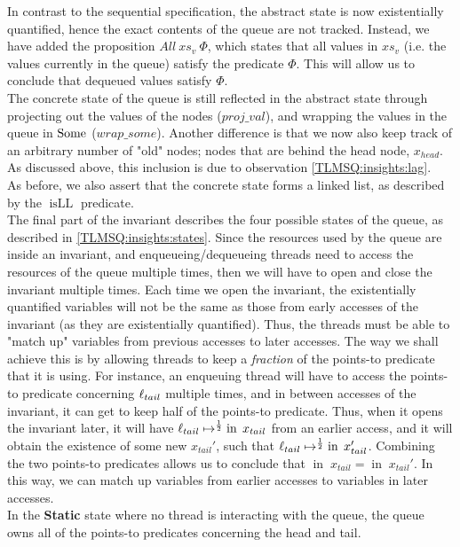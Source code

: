 \documentclass[a4paper, 11pt]{report}
\newcommand{\isLL}{\operatorname{isLL}}
\newcommand{\nIn}[1]{\operatorname{in} \; #1}
\newcommand{\StaticState}{\textbf{Static}}
\begin{document}
In contrast to the sequential specification, the abstract state is now existentially quantified, hence the exact contents of the queue are not tracked. Instead, we have added the proposition $All \ xs_v \ \Phi$, which states that all values in $xs_v$ (i.e. the values currently in the queue) satisfy the predicate $\Phi$. This will allow us to conclude that dequeued values satisfy $\Phi$.\\
The concrete state of the queue is still reflected in the abstract state through projecting out the values of the nodes ($proj\_val$), and wrapping the values in the queue in $\operatorname{Some}$ ($wrap\_some$). Another difference is that we now also keep track of an arbitrary number of "old" nodes; nodes that are behind the head node, $x_{head}$. As discussed above, this inclusion is due to observation \ref{TLMSQ:insights:lag}.\\
As before, we also assert that the concrete state forms a linked list, as described by the $\isLL$ predicate.\\
The final part of the invariant describes the four possible states of the queue, as described in \ref{TLMSQ:insights:states}. Since the resources used by the queue are inside an invariant, and enqueueing/dequeueing threads need to access the resources of the queue multiple times, then we will have to open and close the invariant multiple times. Each time we open the invariant, the existentially quantified variables will not be the same as those from early accesses of the invariant (as they are existentially quantified). Thus, the threads must be able to "match up" variables from previous accesses to later accesses. The way we shall achieve this is by allowing threads to keep a \textit{fraction} of the points-to predicate that it is using. For instance, an enqueuing thread will have to access the points-to predicate concerning $\ell_{tail}$ multiple times, and in between accesses of the invariant, it can get to keep half of the points-to predicate. Thus, when it opens the invariant later, it will have $\loc_{tail} \mapsto^{\frac{1}{2}} \nIn{x_{tail}}$ from an earlier access, and it will obtain the existence of some new $x_{tail}'$, such that $\loc_{tail} \mapsto^{\frac{1}{2}} \nIn{x_{tail}'}$. Combining the two points-to predicates allows us to conclude that $\nIn{x_{tail}} = \nIn{x_{tail}'}$. In this way, we can match up variables from earlier accesses to variables in later accesses.\\
In the \StaticState{} state where no thread is interacting with the queue, the queue owns all of the points-to predicates concerning the head and tail.\\
\end{document}

